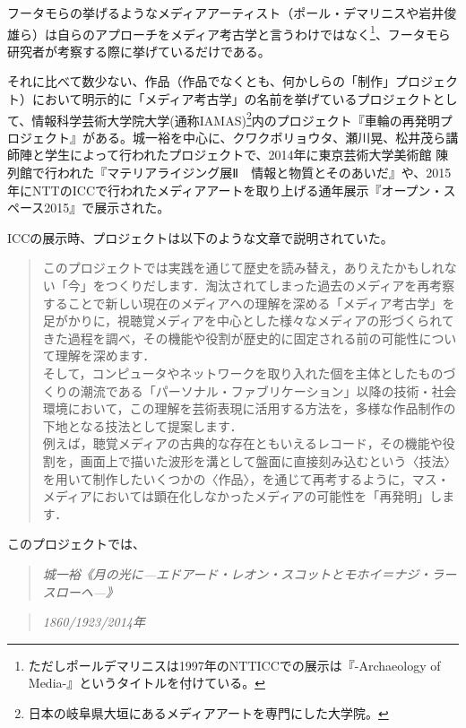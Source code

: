 \documentclass[a4paper,report]{jsbook}
\begin{document}
フータモらの挙げるようなメディアアーティスト（ポール・デマリニスや岩井俊雄ら）は自らのアプローチをメディア考古学と言うわけではなく\footnote{ただしポールデマリニスは1997年のNTTICCでの展示は『-Archaeology
  of Media-』というタイトルを付けている。}、フータモら研究者が考察する際に挙げているだけである。

それに比べて数少ない、作品（作品でなくとも、何かしらの「制作」プロジェクト）において明示的に「メディア考古学」の名前を挙げているプロジェクトとして、情報科学芸術大学院大学(通称IAMAS)\footnote{日本の岐阜県大垣にあるメディアアートを専門にした大学院。}内のプロジェクト『車輪の再発明プロジェクト』がある。城一裕を中心に、クワクボリョウタ、瀬川晃、松井茂ら講師陣と学生によって行われたプロジェクトで、2014年に東京芸術大学美術館
陳列館で行われた『マテリアライジング展Ⅱ　情報と物質とそのあいだ』や、2015年にNTTのICCで行われたメディアアートを取り上げる通年展示『オープン・スペース2015』で展示された。\autocites{iamas:RIWP}{mtrlzng:RIWP}

ICCの展示時、プロジェクトは以下のような文章で説明されていた。

\begin{quote}
このプロジェクトでは実践を通じて歴史を読み替え，ありえたかもしれない「今」をつくりだします．淘汰されてしまった過去のメディアを再考察することで新しい現在のメディアへの理解を深める「メディア考古学」を足がかりに，視聴覚メディアを中心とした様々なメディアの形づくられてきた過程を調べ，その機能や役割が歴史的に固定される前の可能性について理解を深めます．\\
そして，コンピュータやネットワークを取り入れた個を主体としたものづくりの潮流である「パーソナル・ファブリケーション」以降の技術・社会環境において，この理解を芸術表現に活用する方法を，多様な作品制作の下地となる技法として提案します．\\
例えば，聴覚メディアの古典的な存在ともいえるレコード，その機能や役割を，画面上で描いた波形を溝として盤面に直接刻み込むという〈技法〉を用いて制作したいくつかの〈作品〉，を通じて再考するように，マス・メディアにおいては顕在化しなかったメディアの可能性を「再発明」します．\\
\autocite{iamas:RIWP}
\end{quote}

このプロジェクトでは、

\begin{quote}
\emph{城一裕《月の光に---エドアード・レオン・スコットとモホイ＝ナジ・ラースローヘ---》}
\end{quote}

\begin{quote}
\emph{1860/1923/2014年}
\end{quote}
\end{document}
